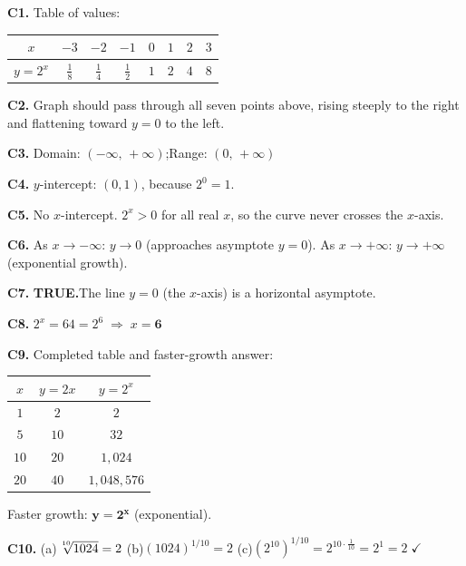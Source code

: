 \documentclass[12pt, letterpaper]{article}
\newcommand{\nthroot}[2]{\sqrt[\leftroot{-1}\uproot{2}#1]{#2}}
\begin{document}
\vspace{10pt}

\begin{ansbox}[Part C \quad The Exponential Function $y=2^x$]

\noindent\textbf{C1.} Table of values:

\smallskip
\begin{center}
\renewcommand{\arraystretch}{1.4}
\begin{tabular}{|c|c|c|c|c|c|c|c|}
\hline
$x$ & $-3$ & $-2$ & $-1$ & $0$ & $1$ & $2$ & $3$ \\
\hline
$y=2^x$ & $\tfrac{1}{8}$ & $\tfrac{1}{4}$ & $\tfrac{1}{2}$ & $1$ & $2$ & $4$ & $8$ \\
\hline
\end{tabular}
\end{center}

\medskip
\noindent\textbf{C2.} Graph should pass through all seven points above, rising steeply to the right and
flattening toward $y=0$ to the left.

\medskip
\noindent\textbf{C3.} Domain: $(-\infty,\,+\infty)$;\quad Range: $(0,\,+\infty)$

\medskip
\noindent\textbf{C4.} $y$-intercept: $(0,1)$, because $2^0=1$.

\medskip
\noindent\textbf{C5.} No $x$-intercept. $2^x>0$ for all real $x$, so the curve never crosses the $x$-axis.

\medskip
\noindent\textbf{C6.} As $x\to-\infty$: $y\to 0$ (approaches asymptote $y=0$).
\quad As $x\to+\infty$: $y\to+\infty$ (exponential growth).

\medskip
\noindent\textbf{C7.} \textbf{TRUE.}\enspace The line $y=0$ (the $x$-axis) is a horizontal asymptote.

\medskip
\noindent\textbf{C8.} $2^x=64=2^6\;\Rightarrow\;x=\mathbf{6}$

\medskip
\noindent\textbf{C9.} Completed table and faster-growth answer:

\smallskip
\begin{center}
\renewcommand{\arraystretch}{1.4}
\begin{tabular}{|c|c|c|}
\hline
$x$ & $y=2x$ & $y=2^x$ \\
\hline
$1$  & $2$  & $2$ \\
$5$  & $10$ & $32$ \\
$10$ & $20$ & $1{,}024$ \\
$20$ & $40$ & $1{,}048{,}576$ \\
\hline
\end{tabular}
\end{center}
\smallskip
Faster growth: $\mathbf{y=2^x}$ (exponential).

\medskip
\noindent\textbf{C10.}
(a)\;$\nthroot{10}{1024}=2$\quad
(b)\;$(1024)^{1/10}=2$\quad
(c)\;$(2^{10})^{1/10}=2^{10\cdot\frac{1}{10}}=2^1=2\;\checkmark$

\end{ansbox}
\end{document}
